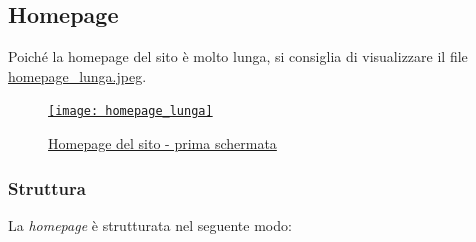 \documentclass[12pt, a4paper,titlepage]{article}
\begin{document}
\subsection{Homepage}
\label{sub:homepage}
Poiché la homepage del sito è molto lunga, si consiglia di visualizzare il file \href{pic/homepage_lunga.jpeg}{\underline{homepage\_lunga.jpeg}}.
\begin{figure}[h]
\centering
\href{pic/homepage1.png}{\texttt{[image: homepage\_lunga]}}
\caption{\href{pic/homepage_lunga.jpeg}{Homepage del sito - prima schermata}}
\end{figure}
\subsubsection{Struttura}
\label{sub:home-struttura}
La \emph{homepage} è strutturata nel seguente modo:
\end{document}

